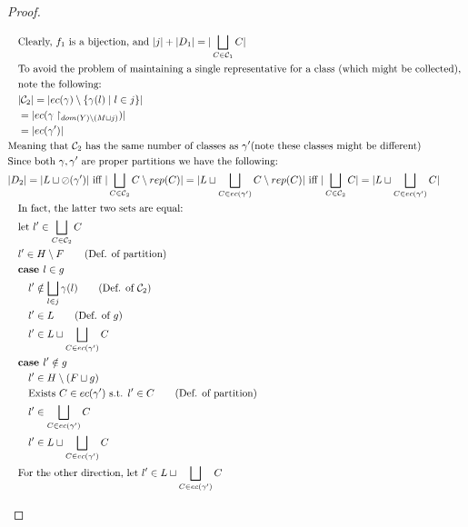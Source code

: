 \documentclass[11pt]{article}
\newcommand{\oh}[1]{\oslash(#1)}
\theoremstyle{definition}
\begin{document}
\begin{proof}
\begin{description}
\begin{align*}
		&\quad \text{Clearly, } f_1 \text{ is a bijection, and } |j| + |D_1| = |\bigsqcup_{C \in \mathcal{C}_1} C|\\
		&\quad \text{To avoid the problem of maintaining a single representative for a class (which might be 
		collected), }\\
		&\quad \text{note the following: }\\
		&\quad |\mathcal{C}_2| = |ec(\gamma) \setminus \{\gamma(l) \mid l \in j\}|\\
		&\quad = |ec(\gamma \restriction_{dom(Y) \setminus (M \sqcup j)})|\\
		&\quad = |ec(\gamma')|\\
		&\text{Meaning that } \mathcal{C}_2 \text{ has the same number of classes as } \gamma' 
			\text{(note these classes might be different)}\\
		&\text{Since both } \gamma,\gamma' \text{ are proper partitions we have the following: }\\
		&|D_2| = |L \sqcup \oh{\gamma'}| \text{ iff } 
			|\bigsqcup_{C  \in \mathcal{C}_2} C \setminus rep(C)| =
			|L \sqcup \bigsqcup_{C \in ec(\gamma')} C \setminus rep(C)|
			\text{ iff }
		|\bigsqcup_{C  \in \mathcal{C}_2} C| = |L \sqcup \bigsqcup_{C \in ec(\gamma')} C|\\ 
		&\quad \text{In fact, the latter two sets are equal: }\\
		&\quad \text{let } l' \in \bigsqcup_{C  \in \mathcal{C}_2} C\\
		&\quad l' \in H \setminus F \tag{Def. of partition}\\
		&\quad \textbf{case } l \in g\\
		&\quad\quad l' \notin \bigsqcup_{l \in j} \gamma(l) \tag{Def. of $\mathcal{C}_2$}\\
		&\quad\quad l' \in L \tag{Def. of $g$}\\
		&\quad\quad l' \in L \sqcup \bigsqcup_{C \in ec(\gamma')} C\\
		&\quad \textbf{case } l' \notin g\\
		&\quad\quad l' \in H \setminus (F \sqcup g)\\
		&\quad\quad \text{Exists } C \in ec(\gamma') \text{ s.t. } l' \in C \tag{Def. of partition}\\
		&\quad\quad l' \in \bigsqcup_{C \in ec(\gamma')} C\\
		&\quad\quad l' \in L \sqcup \bigsqcup_{C \in ec(\gamma')} C\\
		&\quad\text{For the other direction, let } l' \in L \sqcup \bigsqcup_{C \in ec(\gamma')} C\\

\end{align*}
\end{description}
\end{proof}
\end{document}
